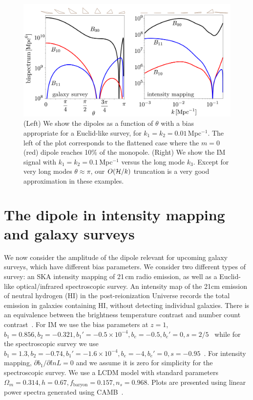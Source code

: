 \begin{figure}%
\begin{center}
\includegraphics[width=\columnwidth]{fig/figuresv2-01}
\caption{ (Left) We show the dipoles as a function of $\theta$ with a bias appropriate for a Euclid-like survey, for $k_1=k_2=0.01$\,Mpc$^{-1}$. The left of the plot corresponds to the flattened case where the $m=0$ (red) dipole reaches 10\% of the monopole.  (Right) We show the IM signal with $k_1=k_2=0.1$\,Mpc$^{-1}$ versus the long mode $k_3$. Except for very long modes $\theta\approx\pi$, our $O(\mathcal{H}/k)$ truncation is a very good approximation in these examples. }
\label{sankcjnakjdcs}
\end{center}
\end{figure}
 


\section{The dipole in intensity mapping and galaxy surveys}

We now consider the amplitude of the dipole relevant for upcoming galaxy surveys, which have different bias parameters. We consider two different types of survey: an SKA intensity mapping of 21\,cm radio emission, as well as a Euclid-like optical/infrared spectroscopic survey.
An intensity map of the 21cm emission of neutral hydrogen (HI) in the post-reionization Universe records the total emission in galaxies containing HI, without detecting individual galaxies. There is an equivalence between the brightness temperature contrast and number count contrast~\citep{Umeh:2015gza}. For IM we use the bias parameters at $z=1$, 
$b_1 = 0.856, b_2 = -0.321, b_1' = -0.5\times10^{-4}, b_e = -0.5, b_e'=0, s = 2/5$~\citep{Fonseca:2018hsu,Umeh:2015gza}
while for the spectroscopic survey we use 
$ b_1 = 1.3,b_2 = -0.74, b_1' = -1.6\times10^{-4},  b_e = -4, b_e' = 0, s = -0.95$~\citep{Camera:2018jys,Yankelevich:2018uaz}.
For intensity mapping, $ \partial b_1/\partial ln L =0$ and we assume it is zero for simplicity for the spectroscopic survey. We use a LCDM model with standard parameters $\Omega_m=0.314, h=0.67, f_\text{baryon}=0.157, n_s=0.968$. Plots are presented using linear power spectra generated using CAMB~\citep{Lewis:1999bs}.

